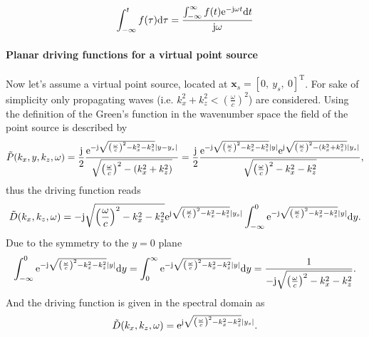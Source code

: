 \begin{equation}
\int_{-\infty}^{t} f(\tau) \mathrm{d} \tau = \frac{\int_{-\infty}^{\infty} f(t) \mathrm{e}^{-\mathrm{j} \omega t} \mathrm{d} t}{\mathrm{j} \omega}
\end{equation}

\paragraph{Planar driving functions for a virtual point source \\}
Now let's assume a virtual point source, located at $\mathbf{x}_s = [ 0,\ y_s,\ 0]^{\mathrm{T}}$. 
For sake of simplicity only propagating waves (i.e. $k_x^2 + k_z^2 < \left( \frac{\omega}{c} \right)^2$) are considered.
Using the definition of the Green's function in the wavenumber space the field of the point source is described by 
\begin{multline}
\tilde{P}(k_x,y,k_z,\omega ) = \frac{\mathrm{j}}{2}\frac{\mathrm{e}^{-\mathrm{j} \sqrt{ \left( \frac{\omega}{c} \right)^2 - k_x^2 - k_z^2  }|y - y_s|}}{\sqrt{ \left( \frac{\omega}{c} \right)^2 - ( k_x^2 + k_z^2 ) }} 
= \frac{\mathrm{j}}{2}\frac{\mathrm{e}^{-\mathrm{j} \sqrt{ \left( \frac{\omega}{c} \right)^2 -  k_x^2 - k_z^2  }|y|} \mathrm{e}^{\mathrm{j} \sqrt{ \left( \frac{\omega}{c} \right)^2 - ( k_x^2 + k_z^2 ) }|y_s|}}{\sqrt{ \left( \frac{\omega}{c} \right)^2 -  k_x^2 - k_z^2  }} 
,
\end{multline}
thus the driving function reads
\begin{equation}
\tilde{D}(k_x,k_z,\omega)
= -\mathrm{j} \sqrt{ \left( \frac{\omega}{c}  \right)^2 - k_x^2 - k_z^2  } \mathrm{e}^{\mathrm{j} \sqrt{ \left( \frac{\omega}{c} \right)^2 - k_x^2 - k_z^2 }|y_s|} 
 \int_{-\infty}^{0} \mathrm{e}^{-\mathrm{j} \sqrt{ \left( \frac{\omega}{c} \right)^2 - k_x^2 - k_z^2 }|y|}  \mathrm{d} y .
\end{equation}
Due to the symmetry to the $y = 0$ plane 
\begin{equation}
\int_{-\infty}^{0} \mathrm{e}^{-\mathrm{j} \sqrt{ \left( \frac{\omega}{c} \right)^2 - k_x^2 - k_z^2  }|y|}  \mathrm{d} y = 
\int_{0}^{\infty}  \mathrm{e}^{-\mathrm{j} \sqrt{ \left( \frac{\omega}{c} \right)^2 - k_x^2 - k_z^2  }|y|}  \mathrm{d} y = 
\frac{1}{-\mathrm{j} \sqrt{ \left( \frac{\omega}{c} \right)^2 - k_x^2 - k_z^2 }}.
\end{equation}
And the driving function is given in the spectral domain as
\begin{equation}
\tilde{D}(k_x,k_z,\omega)
= \mathrm{e}^{\mathrm{j} \sqrt{ \left( \frac{\omega}{c} \right)^2 - k_x^2 - k_z^2 }|y_s|} .
\end{equation}

